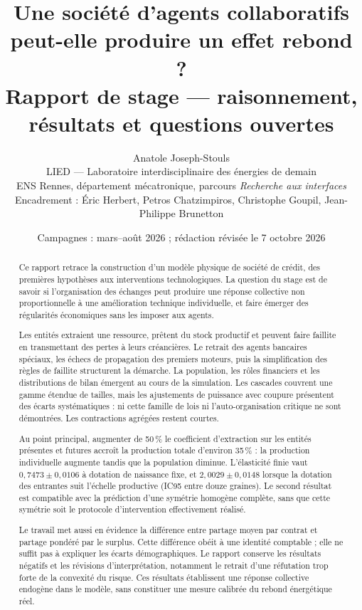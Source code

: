 \documentclass[11pt,a4paper]{article}
\title{Une société d'agents collaboratifs\\
peut-elle produire un effet rebond ?\\
\large Rapport de stage --- raisonnement, résultats et questions ouvertes}
\author{Anatole Joseph-Stouls\\
\small LIED --- Laboratoire interdisciplinaire des énergies de demain\\
\small ENS Rennes, département mécatronique, parcours \emph{Recherche aux interfaces}\\
\small Encadrement : Éric Herbert, Petros Chatzimpiros, Christophe Goupil,
Jean-Philippe Brunetton}
\date{Campagnes : mars--août 2026 ; rédaction révisée le 7 octobre 2026}
\begin{document}
\maketitle

\begin{abstract}
Ce rapport retrace la construction d'un modèle physique de société de crédit,
des premières hypothèses aux interventions technologiques. La question du
stage est de savoir si l'organisation des échanges peut produire une réponse
collective non proportionnelle à une amélioration technique individuelle,
et faire émerger des régularités économiques sans les imposer aux agents.

Les entités extraient une ressource, prêtent du stock productif et peuvent
faire faillite en transmettant des pertes à leurs créancières. Le retrait
des agents bancaires spéciaux, les échecs de propagation des premiers moteurs,
puis la simplification des règles de faillite structurent la démarche.
La population, les rôles financiers et les distributions de bilan émergent
au cours de la simulation. Les cascades couvrent une gamme étendue de tailles,
mais les ajustements de puissance avec coupure présentent des écarts
systématiques : ni cette famille de lois ni l'auto-organisation critique
ne sont démontrées. Les contractions agrégées restent courtes.

Au point principal, augmenter de 50\,\% le coefficient d'extraction sur les
entités présentes et futures accroît la production totale d'environ 35\,\% :
la production individuelle augmente tandis que la population diminue.
L'élasticité finie vaut $0{,}7473\pm0{,}0106$ à dotation de naissance fixe,
et $2{,}0029\pm0{,}0148$ lorsque la dotation des entrantes suit l'échelle
productive (IC95 entre douze graines). Le second résultat est compatible
avec la prédiction d'une symétrie homogène complète, sans que cette symétrie
soit le protocole d'intervention effectivement réalisé.

Le travail met aussi en évidence la différence entre partage moyen par
contrat et partage pondéré par le surplus. Cette différence obéit à une
identité comptable ; elle ne suffit pas à expliquer les écarts démographiques.
Le rapport conserve les résultats négatifs et les révisions d'interprétation,
notamment le retrait d'une réfutation trop forte de la convexité du risque.
Ces résultats établissent une réponse collective endogène dans le modèle,
sans constituer une mesure calibrée du rebond énergétique réel.


\end{abstract}
\end{document}
